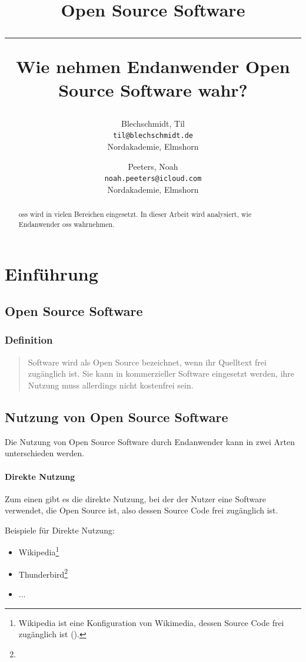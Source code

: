 \documentclass[a4paper]{article}
\title{Open Source Software \\
    \noindent\rule[0.25ex]{\linewidth}{0.5pt}
    \large Wie nehmen Endanwender Open Source Software wahr?
}
\author{
  Blechschmidt, Til\\
  \texttt{til@blechschmidt.de}\\
  Nordakademie, Elmshorn
  \and
  Peeters, Noah\\
  \texttt{noah.peeters@icloud.com}\\
  Nordakademie, Elmshorn
}
\begin{document}
    \thispagestyle{fancy}
    \maketitle

    \begin{abstract}
         \gls{oss} wird in vielen Bereichen eingesetzt. In dieser Arbeit wird analysiert, wie Endanwender \gls{oss} wahrnehmen.
    \end{abstract}
    \newpage

    \tableofcontents
    \clearpage

    \section{Einführung}
        \subsection{Open Source Software}
            \subsubsection{Definition}
                \begin{quote} 
                    \centering 
                    Software wird als Open Source bezeichnet, wenn ihr Quelltext frei zugänglich ist. Sie kann in kommerzieller Software eingesetzt werden, ihre Nutzung muss allerdings nicht kostenfrei sein. 
                \end{quote}
                
        \subsection{Nutzung von Open Source Software}
            Die Nutzung von Open Source Software durch Endanwender kann in zwei Arten unterschieden werden.
            
            \paragraph{Direkte Nutzung}
                Zum einen gibt es die direkte Nutzung, bei der der Nutzer eine Software verwendet, die Open Source ist, also dessen Source Code frei zugänglich ist.
                
                Beispiele für Direkte Nutzung:
                \begin{itemize}
                    \item Wikipedia\footnote{Wikipedia ist eine Konfiguration von Wikimedia, dessen Source Code frei zugänglich ist ().}
                    \item Thunderbird\footnote{}
                    \item ... %
                \end{itemize}
                
\end{document}
